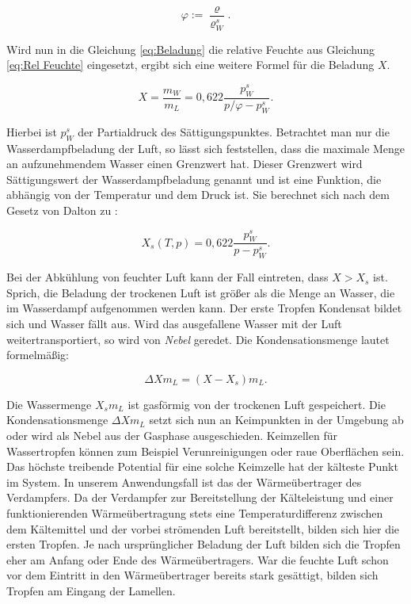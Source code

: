 \begin{equation}
 \varphi := \frac{\varrho}{\varrho_W^s}.
 \label{eq:Rel Feuchte}
\end{equation}

Wird nun in die Gleichung \ref{eq:Beladung} die relative Feuchte aus Gleichung \ref{eq:Rel Feuchte} eingesetzt, ergibt sich eine weitere Formel für die Beladung $X$. 

\begin{equation}
X = \frac{m_W}{m_L} = 0,622 \frac{p_{W}^s}{p/\varphi - p_{W}^s}.
\label{eq:Beladung 2}
\end{equation}

Hierbei ist $p_{W}^s$ der Partialdruck des Sättigungspunktes.
Betrachtet man nur die Wasserdampfbeladung der Luft, so lässt sich feststellen, dass die maximale Menge an aufzunehmendem Wasser einen Grenzwert hat. Dieser Grenzwert wird Sättigungswert der Wasserdampfbeladung genannt und ist eine Funktion, die abhängig von der Temperatur und dem Druck ist.  Sie berechnet sich nach dem Gesetz von Dalton zu :

\begin{equation}
 X_s (T,p) = 0,622 \frac{p_{W}^s}{p - p_{W}^s}.
 \label{eq:Sättigungsbeladung}
\end{equation}

Bei der Abkühlung von feuchter Luft kann der Fall eintreten, dass $X > X_s$ ist. Sprich, die Beladung der trockenen Luft ist größer als die Menge an Wasser, die im Wasserdampf aufgenommen werden kann. Der erste Tropfen Kondensat bildet sich und Wasser fällt aus. Wird das ausgefallene Wasser mit der Luft weitertransportiert, so wird von \textit{Nebel} geredet. Die Kondensationsmenge lautet formelmäßig:

\begin{equation}
\Delta X m_L = (X - X_s)m_L.
\label{eq:Delta_X}
\end{equation}

Die Wassermenge $X_s m_L$ ist gasförmig von der trockenen Luft gespeichert. Die Kondensationsmenge $\Delta X m_L$ setzt sich nun an Keimpunkten in der Umgebung ab oder wird als Nebel aus der Gasphase ausgeschieden. Keimzellen für Wassertropfen können zum Beispiel Verunreinigungen oder raue Oberflächen sein. Das höchste treibende Potential für eine solche Keimzelle hat der kälteste Punkt im System. In unserem Anwendungsfall ist das der Wärmeübertrager des Verdampfers. Da der Verdampfer zur Bereitstellung der Kälteleistung und einer funktionierenden Wärmeübertragung stets eine Temperaturdifferenz zwischen dem Kältemittel und der vorbei strömenden Luft  bereitstellt,  bilden sich hier die ersten Tropfen. Je nach ursprünglicher Beladung der Luft bilden sich die Tropfen eher am Anfang oder Ende des Wärmeübertragers. War die feuchte Luft schon vor dem Eintritt in den Wärmeübertrager bereits stark gesättigt, bilden sich Tropfen am Eingang der Lamellen. \citep{Danfoss2006}

